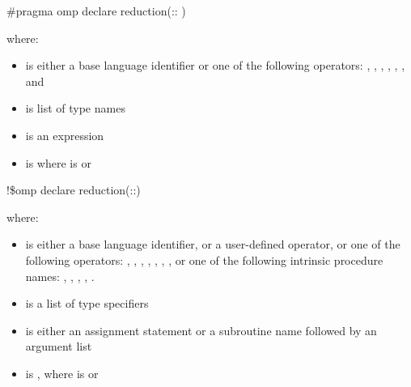 \cppspecificstart
\begin{boxedcode}
\#pragma omp declare reduction(:: 
)
\end{boxedcode}

where:

\begin{itemize}
\item {} is either a base language identifier or one of the following 
operators: 
\code{+}, 
\code{-}, 
\code{*}, 
\code{\&}, 
\code{|}, 
\code{\^}, 
\code{\&\&} and 
\code{||} 

\item {} is list of type names 

\item {} is an expression 

\item {} is \code{)} 
where  is\linebreak
{}  or \code{(}\code{)} 
\end{itemize}
\cppspecificend


\fortranspecificstart
\begin{boxedcode}
!\$omp declare reduction(::) 
\end{boxedcode}

where:

\begin{itemize}
\item {} is either a base language identifier, or a user-defined operator, or 
one of the following operators: 
\code{+}, 
\code{-}, 
\code{*}, 
, 
, 
, 
, or one of the following intrinsic procedure names: 
, 
, 
, 
, 
. 

\item {} is a list of type specifiers 

\item {} is either an assignment statement or a subroutine name followed by an 
argument list 

\item {} is \code{)}, 
where  is\linebreak
{} or \code{(}\code{)}
\end{itemize}
\fortranspecificend

